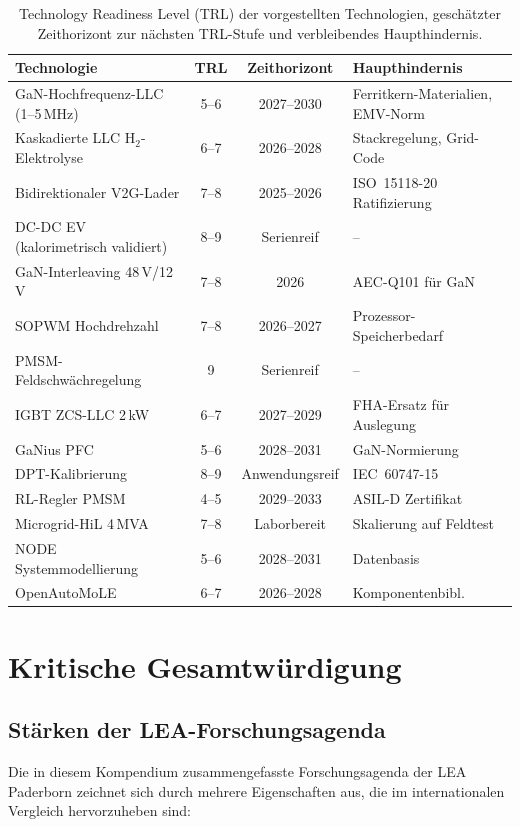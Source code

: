 ﻿\documentclass[a4paper,12pt,openany,oneside]{book}
\newcommand{\abschnitt}[1]{\section{#1}}
\newcommand{\unterabschnitt}[1]{\subsection{#1}}
\theoremstyle{definition}
\begin{document}
\begin{table}[H]
\centering
\renewcommand{\arraystretch}{1.35}
\begin{tabular}{p{4.0cm}ccp{3.5cm}}
\toprule
\textbf{Technologie} & \textbf{TRL} & \textbf{Zeithorizont} & \textbf{Haupthindernis} \\
\midrule
GaN-Hochfrequenz-LLC (1--5\,MHz) & 5--6 & 2027--2030 &
  Ferritkern-Materialien, EMV-Norm \\
Kaskadierte LLC H$_2$-Elektrolyse & 6--7 & 2026--2028 &
  Stackregelung, Grid-Code \\
Bidirektionaler V2G-Lader & 7--8 & 2025--2026 &
  ISO~15118-20 Ratifizierung \\
DC-DC EV (kalorimetrisch validiert) & 8--9 & Serienreif &
  -- \\
GaN-Interleaving 48\,V/12\,V & 7--8 & 2026 &
  AEC-Q101 f\"ur GaN \\
SOPWM Hochdrehzahl & 7--8 & 2026--2027 &
  Prozessor-Speicherbedarf \\
PMSM-Feldschwächregelung & 9 & Serienreif &
  -- \\
IGBT ZCS-LLC 2\,kW & 6--7 & 2027--2029 &
  FHA-Ersatz f\"ur Auslegung \\
GaNius PFC & 5--6 & 2028--2031 & GaN-Normierung \\
DPT-Kalibrierung & 8--9 & Anwendungsreif & IEC~60747-15 \\
RL-Regler PMSM & 4--5 & 2029--2033 & ASIL-D Zertifikat \\
Microgrid-HiL 4\,MVA & 7--8 & Laborbereit &
  Skalierung auf Feldtest \\
NODE Systemmodellierung & 5--6 & 2028--2031 & Datenbasis \\
OpenAutoMoLE & 6--7 & 2026--2028 & Komponentenbibl. \\
\bottomrule
\end{tabular}
\caption{Technology Readiness Level (TRL) der vorgestellten Technologien,
         gesch\"atzter Zeithorizont zur n\"achsten TRL-Stufe und verbleibendes
         Haupthindernis.}
\label{tab:trl}
\end{table}

\abschnitt{Kritische Gesamtw\"urdigung}

\unterabschnitt{St\"arken der LEA-Forschungsagenda}

Die in diesem Kompendium zusammengefasste Forschungsagenda der LEA Paderborn zeich\-net
sich durch mehrere Eigenschaften aus, die im internationalen Vergleich hervorzuheben sind:
\end{document}
